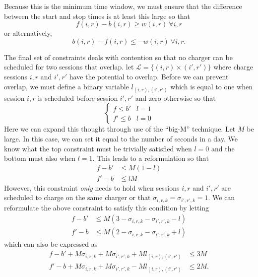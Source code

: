 \par Because this is the minimum time window, we must ensure that the difference between the start and stop times is at least this large so that
\begin{equation*}
	f(i,r) - b(i,r) \ge w(i,r) \ \forall i,r	
\end{equation*}
or alternatively,
\begin{equation}
	b(i,r) - f(i,r) \le -w(i,r) \ \forall i,r.
\end{equation}
\par The final set of constraints deals with contention so that no charger can be scheduled for two sessions that overlap. let $\mathcal{L} = \{(i,r)\times (i',r') \}$ where charge sessions $i,r$ and $i',r'$ have the potential to overlap. Before we can prevent overlap, we must define a binary variable $l_{(i,r),(i',r')}$ which is equal to one when session $i,r$ is scheduled before session $i',r'$ and zero otherwise so that
\begin{equation*}
	\begin{cases}
		f \le b' & l = 1 \\
		f' \le b & l = 0 
	\end{cases}
\end{equation*}
Here we can expand this thought through use of the ``big-M'' technique.  Let $M$ be large. In this case, we can set it equal to the number of seconds in a day. We know what the top constraint must be trivially satisfied when $l = 0$ and the bottom must also when $l = 1$.  This leads to a reformulation so that
\begin{equation*}\begin{aligned}
		f - b' & \le M(1 - l)\\
		f' - b & \le lM  
\end{aligned}\end{equation*}
However, this constraint {\it only} needs to hold when sessions $i,r$ and $i',r'$ are scheduled to charge on the same charger or that $\sigma_{i,r,k} = \sigma_{i',r',k} = 1$. We can reformulate the above constraint to satisfy this condition by letting
\begin{equation*}\begin{aligned}
	f - b' & \le M(3 - \sigma_{i,r,k} - \sigma_{i',r',k} - l) \\
	f' - b & \le M(2 - \sigma_{i,r,k} - \sigma_{i',r',k} + l)
\end{aligned}\end{equation*}
which can also be expressed as
\begin{equation}\begin{aligned}
	f - b' + M\sigma_{i,r,k} + M\sigma_{i',r',k} + Ml_{(i,r),(i',r')} &\le 3M \\
	f' - b + M\sigma_{i,r,k} + M\sigma_{i',r',k} - Ml_{(i,r),(i',r')} &\le 2M.
\end{aligned}\end{equation}
